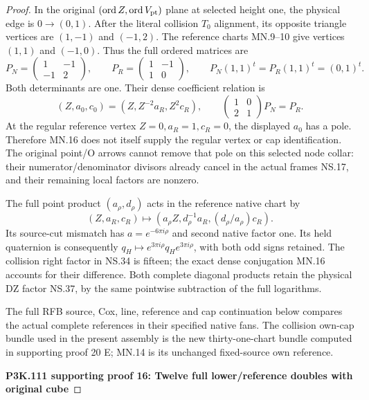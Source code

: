 \begin{proof}
In the original \((\operatorname{ord}Z,\operatorname{ord}V_{\rm pt})\)
plane at selected height one, the physical edge is
\(0\to(0,1)\). After the literal collision \(T_0\) alignment,
its opposite triangle vertices are \((1,-1)\) and \((-1,2)\).
The reference charts MN.9--10 give vertices \((1,1)\) and
\((-1,0)\). Thus the full ordered matrices are
\[
 P_N=\begin{pmatrix}1&-1\\-1&2\end{pmatrix},\qquad
 P_R=\begin{pmatrix}1&-1\\1&0\end{pmatrix},\qquad
 P_N(1,1)^t=P_R(1,1)^t=(0,1)^t.
 \tag{MN.15}
\]
Both determinants are one. Their dense coefficient relation is
\[
 (Z,a_0,c_0)=(Z,Z^{-2}a_R,Z^2c_R),\qquad
 \begin{pmatrix}1&0\\2&1\end{pmatrix}P_N=P_R.
 \tag{MN.16}
\]
At the regular reference vertex \(Z=0,a_R=1,c_R=0\), the displayed
\(a_0\) has a pole. Therefore MN.16 does not itself supply the
regular vertex or cap identification. The original point/O arrows
cannot remove that pole on this selected node collar: their
numerator/denominator divisors already cancel in the actual frames
NS.17, and their remaining local factors are nonzero.

The full point product \((a_\rho,d_\rho)\) acts in the reference
native chart by
\[
 (Z,a_R,c_R)\mapsto
       (a_\rho Z,d_\rho^{-1}a_R,(d_\rho/a_\rho)c_R).
 \tag{MN.17}
\]
Its source-cut mismatch has \(a=e^{-6\pi i\rho}\) and second
native factor one. Its held quaternion is consequently
\(q_H\mapsto e^{3\pi i\rho}q_He^{3\pi i\rho}\), with both
odd signs retained. The collision right factor in NS.34 is fifteen;
the exact dense conjugation MN.16 accounts for their difference.
Both complete diagonal products retain the physical DZ factor
NS.37, by the same pointwise subtraction of the full logarithms.

The full RFB source, Cox, line, reference and cap continuation below
compares the actual complete references in their specified native fans.
The collision own-cap bundle used in the present assembly is the new
thirty-one-chart bundle computed in supporting proof 20 E; MN.14 is
its unchanged fixed-source own reference.



\par\bigskip\noindent\textbf{P3K.111 supporting proof 16: Twelve full lower/reference doubles with original cube}\par\nobreak
\par


\end{proof}
